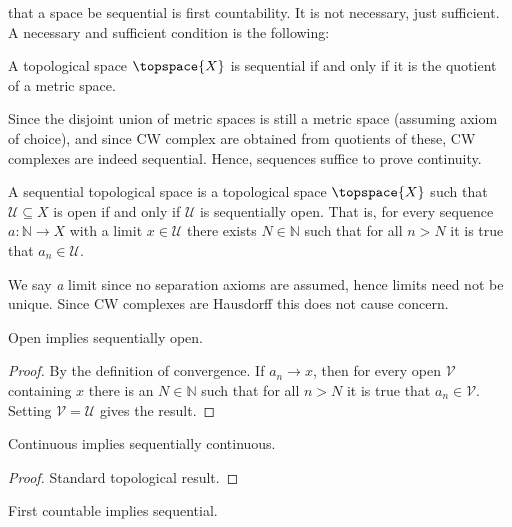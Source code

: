             that a space be sequential is first countability. It is not
            necessary, just sufficient. A necessary and sufficient
            condition is the following:
            \begin{theorem}
                A topological space $\topspace{X}$ is sequential if and
                only if it is the quotient of a metric space.
            \end{theorem}
            Since the disjoint union of metric spaces is still a metric
            space (assuming axiom of choice), and since CW complex are
            obtained from quotients of these, CW complexes are indeed
            sequential. Hence, sequences suffice to prove continuity.
            \begin{definition}
                A sequential topological space is a topological space
                $\topspace{X}$ such that $\mathcal{U}\subseteq{X}$ is
                open if and only if $\mathcal{U}$ is sequentially open.
                That is, for every sequence $a:\mathbb{N}\rightarrow{X}$
                with a limit $x\in\mathcal{U}$ there exists
                $N\in\mathbb{N}$ such that for all $n>N$ it is true that
                $a_{n}\in\mathcal{U}$.
            \end{definition}
            We say \textit{a} limit since no separation axioms are
            assumed, hence limits need not be unique. Since CW complexes
            are Hausdorff this does not cause concern.
            \begin{theorem}
                Open implies sequentially open.
            \end{theorem}
            \begin{proof}
                By the definition of convergence. If
                $a_{n}\rightarrow{x}$, then for every open $\mathcal{V}$
                containing $x$ there is an $N\in\mathbb{N}$ such that
                for all $n>N$ it is true that $a_{n}\in\mathcal{V}$.
                Setting $\mathcal{V}=\mathcal{U}$ gives the result.
            \end{proof}
            \begin{theorem}
                Continuous implies sequentially continuous.
            \end{theorem}
            \begin{proof}
                Standard topological result.
            \end{proof}
            \begin{theorem}
                First countable implies sequential.
            \end{theorem}
